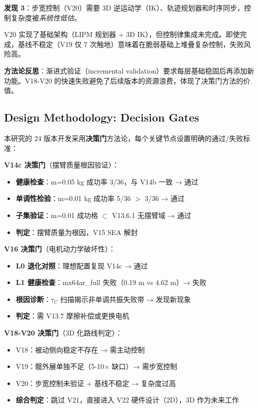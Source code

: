 \textbf{发现 3}：步宽控制（V20）需要 3D 逆运动学（IK）、轨迹规划器和时序同步，控制复杂度被\textit{系统性低估}。

V20 实现了基础架构（LIPM 规划器 + 3D IK），但控制律集成未完成。即使完成，基线不稳定（V19 仅 7 次触地）意味着在脆弱基础上堆叠复杂控制，失败风险高。

\textbf{方法论反思}：渐进式验证（incremental validation）要求每层基础稳固后再添加新功能。V18-V20 的快速失败避免了后续版本的资源浪费，体现了决策门方法的价值。

\subsection{Design Methodology: Decision Gates}

本研究的 24 版本开发采用\textbf{决策门}方法论，每个关键节点设置明确的通过/失败标准：

\textbf{V14c 决策门}（摆臂质量根因验证）：
\begin{itemize}
    \item \textbf{健康检查}：m=0.05 kg 成功率 3/36，与 V14b 一致 → 通过
    \item \textbf{单调性检验}：m=0.01 kg 成功率 5/36 $>$ 3/36 → 通过
    \item \textbf{子集验证}：m=0.01 成功格 $\subset$ V13.6.1 无摆臂域 → 通过
    \item \textbf{判定}：摆臂质量为根因，V15 SEA 解封
\end{itemize}

\textbf{V16 决策门}（电机动力学破坏性）：
\begin{itemize}
    \item \textbf{L0 退化对照}：理想配置复现 V14c → 通过
    \item \textbf{L1 健康检查}：mx64ar\_full 失败（0.19 m vs 4.62 m）→ 失败
    \item \textbf{根因诊断}：$\tau_C$ 扫描揭示非单调共振失败带 → 发现新现象
    \item \textbf{判定}：需 V13.7 摩擦补偿或更换电机
\end{itemize}

\textbf{V18-V20 决策门}（3D 化路线判定）：
\begin{itemize}
    \item V18：被动侧向稳定不存在 → 需主动控制
    \item V19：髋外展单独不足（5-10× 缺口）→ 需步宽控制
    \item V20：步宽控制未验证 + 基线不稳定 → 复杂度过高
    \item \textbf{综合判定}：跳过 V21，直接进入 V22 硬件设计（2D），3D 作为未来工作
\end{itemize}


